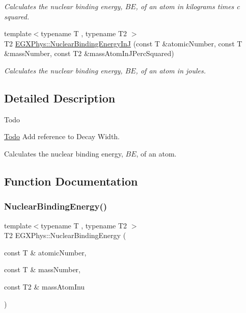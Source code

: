 \begin{DoxyCompactItemize}
\begin{DoxyCompactList}\small\item\em Calculates the nuclear binding energy, $BE$, of an atom in kilograms times c squared. \end{DoxyCompactList}\item 
{\footnotesize template$<$typename T , typename T2 $>$ }\\T2 \mbox{\hyperlink{group___e_g_x_phys-_nuclear_binding_energy_gae48a95188d9b71b36d02babf227b9449}{E\+G\+X\+Phys\+::\+Nuclear\+Binding\+Energy\+InJ}} (const T \&atomic\+Number, const T \&mass\+Number, const T2 \&mass\+Atom\+In\+J\+Perc\+Squared)
\begin{DoxyCompactList}\small\item\em Calculates the nuclear binding energy, $BE$, of an atom in joules. \end{DoxyCompactList}\end{DoxyCompactItemize}


\subsection{Detailed Description}
\begin{DoxyRefDesc}{Todo}
\item[\mbox{\hyperlink{todo__todo000004}{Todo}}]Add reference to Decay Width. \end{DoxyRefDesc}


Calculates the nuclear binding energy, $BE$, of an atom. 

\subsection{Function Documentation}
\mbox{\label{group___e_g_x_phys-_nuclear_binding_energy_gab6832bf15ead7b4e867e759e0a2a078e}} 
\subsubsection{\texorpdfstring{Nuclear\+Binding\+Energy()}{NuclearBindingEnergy()}}
{\footnotesize\ttfamily template$<$typename T , typename T2 $>$ \\
T2 E\+G\+X\+Phys\+::\+Nuclear\+Binding\+Energy (\begin{DoxyParamCaption}\item[{const T \&}]{atomic\+Number,  }\item[{const T \&}]{mass\+Number,  }\item[{const T2 \&}]{mass\+Atom\+Inu }\end{DoxyParamCaption})}




